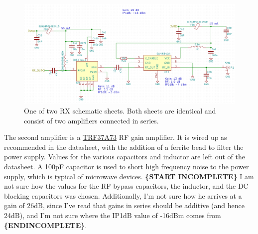 \begin{figure}[h]
  \centering
  \includegraphics[width=\textwidth]{data/rx-sch.png}
  \caption{One of two RX schematic sheets. Both sheets are identical and consist of two amplifiers
    connected in series.}
  \label{fig:rx-sch}
\end{figure}

The second amplifier is a \href{http://www.ti.com/lit/ds/symlink/trf37a73.pdf}{TRF37A73} RF gain
amplifier. It is wired up as recommended in the datasheet, with the addition of a ferrite bead to
filter the power supply. Values for the various capacitors and inductor are left out of the
datasheet. A 100pF capacitor is used to short high frequency noise to the power supply, which is
typical of microwave devices. \textbf{\{START INCOMPLETE\}} I am not sure how the values for the RF
bypass capacitors, the inductor, and the DC blocking capacitors was chosen. Additionally, I'm not
sure how he arrives at a gain of 26dB, since I've read that gains in series should be additive (and
hence 24dB), and I'm not sure where the IP1dB value of -16dBm comes from \textbf{\{ENDINCOMPLETE\}}.

